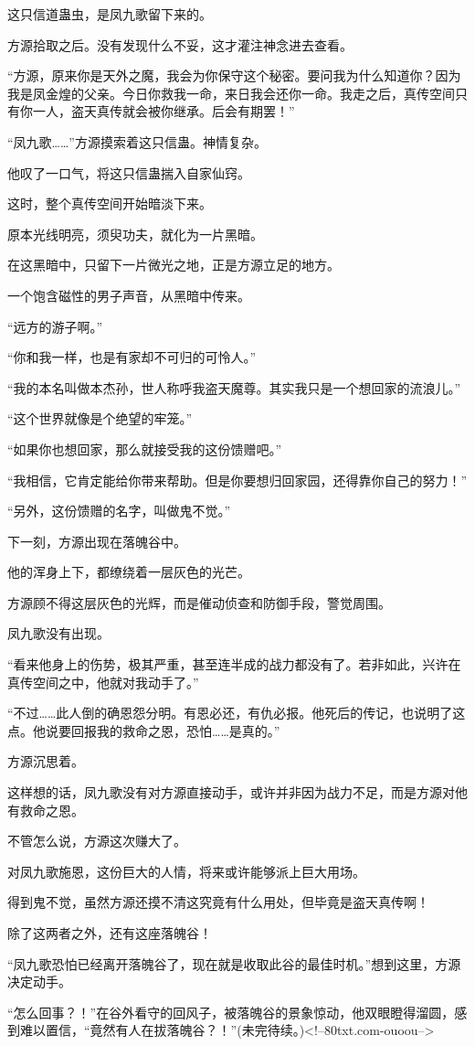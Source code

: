 \begin{this_body}
这只信道蛊虫，是凤九歌留下来的。

方源拾取之后。没有发现什么不妥，这才灌注神念进去查看。

“方源，原来你是天外之魔，我会为你保守这个秘密。要问我为什么知道你？因为我是凤金煌的父亲。今日你救我一命，来日我会还你一命。我走之后，真传空间只有你一人，盗天真传就会被你继承。后会有期罢！”

“凤九歌……”方源摸索着这只信蛊。神情复杂。

他叹了一口气，将这只信蛊揣入自家仙窍。

这时，整个真传空间开始暗淡下来。

原本光线明亮，须臾功夫，就化为一片黑暗。

在这黑暗中，只留下一片微光之地，正是方源立足的地方。

一个饱含磁性的男子声音，从黑暗中传来。

“远方的游子啊。”

“你和我一样，也是有家却不可归的可怜人。”

“我的本名叫做本杰孙，世人称呼我盗天魔尊。其实我只是一个想回家的流浪儿。”

“这个世界就像是个绝望的牢笼。”

“如果你也想回家，那么就接受我的这份馈赠吧。”

“我相信，它肯定能给你带来帮助。但是你要想归回家园，还得靠你自己的努力！”

“另外，这份馈赠的名字，叫做鬼不觉。”

下一刻，方源出现在落魄谷中。

他的浑身上下，都缭绕着一层灰色的光芒。

方源顾不得这层灰色的光辉，而是催动侦查和防御手段，警觉周围。

凤九歌没有出现。

“看来他身上的伤势，极其严重，甚至连半成的战力都没有了。若非如此，兴许在真传空间之中，他就对我动手了。”

“不过……此人倒的确恩怨分明。有恩必还，有仇必报。他死后的传记，也说明了这点。他说要回报我的救命之恩，恐怕……是真的。”

方源沉思着。

这样想的话，凤九歌没有对方源直接动手，或许并非因为战力不足，而是方源对他有救命之恩。

不管怎么说，方源这次赚大了。

对凤九歌施恩，这份巨大的人情，将来或许能够派上巨大用场。

得到鬼不觉，虽然方源还摸不清这究竟有什么用处，但毕竟是盗天真传啊！

除了这两者之外，还有这座落魄谷！

“凤九歌恐怕已经离开落魄谷了，现在就是收取此谷的最佳时机。”想到这里，方源决定动手。

“怎么回事？！”在谷外看守的回风子，被落魄谷的景象惊动，他双眼瞪得溜圆，感到难以置信，“竟然有人在拔落魄谷？！”(未完待续。)<!--80txt.com-ouoou-->

\end{this_body}

